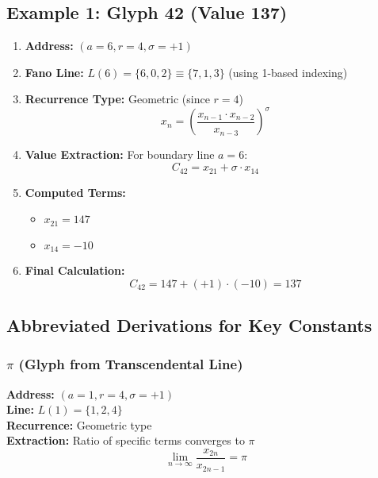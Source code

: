 \documentclass[pdflatex,sn-mathphys-num]{sn-jnl}
\theoremstyle{thmstyleone}
\theoremstyle{thmstyletwo}
\theoremstyle{thmstylethree}
\begin{document}
\subsection{Example 1: Glyph 42 (Value 137)}

\begin{enumerate}
    \item \textbf{Address:} $(a = 6, r = 4, \sigma = +1)$
    
    \item \textbf{Fano Line:} $L(6) = \{6, 0, 2\} \equiv \{7, 1, 3\}$ (using 1-based indexing)
    
    \item \textbf{Recurrence Type:} Geometric (since $r = 4$)
    \begin{equation}
    x_n = \left(\frac{x_{n-1} \cdot x_{n-2}}{x_{n-3}}\right)^{\sigma}
    \end{equation}
    
    \item \textbf{Value Extraction:} For boundary line $a = 6$:
    \begin{equation}
    C_{42} = x_{21} + \sigma \cdot x_{14}
    \end{equation}
    
    \item \textbf{Computed Terms:} 
    \begin{itemize}
        \item $x_{21} = 147$
        \item $x_{14} = -10$
    \end{itemize}
    
    \item \textbf{Final Calculation:}
    \begin{equation}
    C_{42} = 147 + (+1) \cdot (-10) = 137
    \end{equation}
\end{enumerate}

\subsection{Abbreviated Derivations for Key Constants}

\subsubsection{$\pi$ (Glyph from Transcendental Line)}

\textbf{Address:} $(a = 1, r = 4, \sigma = +1)$ \\
\textbf{Line:} $L(1) = \{1, 2, 4\}$ \\
\textbf{Recurrence:} Geometric type \\
\textbf{Extraction:} Ratio of specific terms converges to $\pi$
\begin{equation}
\lim_{n \to \infty} \frac{x_{2n}}{x_{2n-1}} = \pi
\end{equation}
\end{document}
